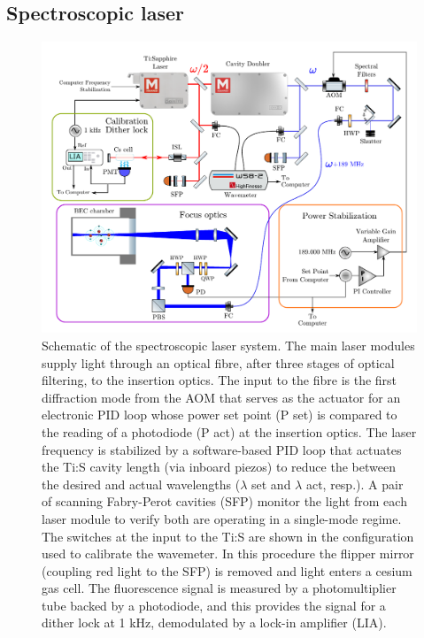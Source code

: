 \subsection*{Spectroscopic laser}
\label{sec:spec_laser}
	\begin{figure}
		\centering
		\includegraphics[width=\textwidth]{fig/apparatus/exp_optics_schematic}
		\caption{Schematic of the spectroscopic laser system.  The main laser modules supply light through an optical fibre, after three stages of optical filtering, to the insertion optics. The input to the fibre is the first diffraction mode from the AOM that serves as the actuator for an electronic PID loop whose power set point (P set) is compared to the reading of a photodiode (P act) at the insertion optics. The laser frequency is stabilized by a software-based PID loop that actuates the Ti:S cavity length (via inboard piezos) to reduce the between the desired and actual wavelengths ($\lambda$ set and $\lambda$ act, resp.). A pair of scanning Fabry-Perot cavities (SFP)  monitor the light from each laser module to verify both are operating in a single-mode regime. The switches at the input to the Ti:S are shown in the configuration used to calibrate the wavemeter. In this procedure the flipper mirror (coupling red light to the SFP) is removed and light enters a cesium gas cell. The fluorescence signal is measured by a photomultiplier tube backed by a photodiode, and this provides the signal for a dither lock at 1 kHz, demodulated by a lock-in amplifier (LIA).}
		\label{fig:tunable_laser}
	\end{figure}

